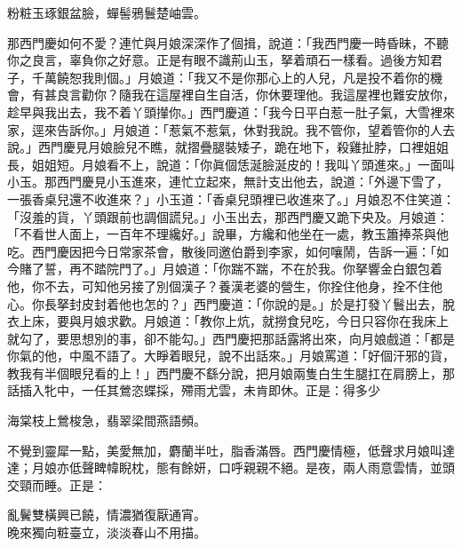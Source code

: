 \begin{myquote} 
粉粧玉琢銀盆臉，蟬髻鴉鬟楚岫雲。{}
\end{myquote} 

那西門慶如何不愛？{}連忙與月娘深深作了個揖，說道：「我西門慶一時昏昧，不聽你之良言，辜負你之好意。正是有眼不識荊山玉，拏着頑石一樣看。過後方知君子，千萬饒恕我則個。」月娘道：「我又不是你那心上的人兒，凡是投不着你的機會，有甚良言勸你？隨我在這屋裡自生自活，你休要理他。我這屋裡也難安放你，趁早與我出去，我不着丫頭攆你。」西門慶道：「我今日平白惹一肚子氣，大雪裡來家，逕來告訴你。」月娘道：「惹氣不惹氣，休對我說。我不管你，望着管你的人去說。」西門慶見月娘臉兒不瞧，就摺疊腿裝矮子，跪在地下，殺雞扯脖，口裡姐姐長，姐姐短。月娘看不上，說道：「你眞個恁涎臉涎皮的！我叫丫頭進來。」一面叫小玉。那西門慶見小玉進來，連忙立起來，無計支出他去，說道：「外邊下雪了，一張香桌兒還不收進來？」小玉道：「香桌兒頭裡已收進來了。」月娘忍不住笑道：「沒羞的貨，丫頭跟前也調個謊兒。」{}小玉出去，那西門慶又跪下央及。月娘道：「不看世人面上，一百年不理纔好。」說畢，方纔和他坐在一處，教玉簫捧茶與他吃。西門慶因把今日常家茶會，散後同邀伯爵到李家，如何嚷鬧，告訴一遍：「如今賭了誓，再不踏院門了。」月娘道：「你踹不踹，不在於我。你拏響金白銀包着他，你不去，可知他另接了別個漢子？養漢老婆的營生，你拴住他身，拴不住他心。你長拏封皮封着他也怎的？」西門慶道：「你說的是。」於是打發丫鬟出去，脫衣上床，要與月娘求歡。月娘道：「教你上炕，就撈食兒吃，今日只容你在我床上就勾了，要思想別的事，卻不能勾。」西門慶把那話露將出來，向月娘戲道：「都是你氣的他，中風不語了。大睜着眼兒，說不出話來。」月娘罵道：「好個汗邪的貨，教我有半個眼兒看的上！」西門慶不繇分說，把月娘兩隻白生生腿扛在肩膀上，那話插入牝中，一任其鶯恣蝶採，殢雨尤雲，未肯即休。正是：得多少

\begin{myquote} 
海棠枝上鶯梭急，翡翠梁間燕語頻。
\end{myquote} 

不覺到靈犀一點，美愛無加，麝蘭半吐，脂香滿唇。西門慶情極，低聲求月娘叫達達；月娘亦低聲睥幃睨枕，態有餘妍，{}口呼親親不絕。是夜，兩人雨意雲情，並頭交頸而睡。正是：

\begin{myquote} 
亂鬢雙橫興已饒，情濃猶復厭通宵。\\晚來獨向粧臺立，淡淡春山不用描。
\end{myquote} 

